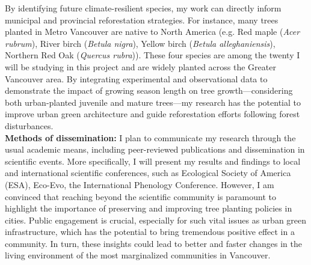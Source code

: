 \documentclass[11pt,letter]{article}
\begin{document}
\par 
By identifying future climate-resilient species, my work can directly inform municipal and provincial reforestation strategies. For instance, many trees planted in Metro Vancouver are native to North America (e.g. Red maple (\textit{Acer rubrum}), River birch (\textit{Betula nigra}), Yellow birch (\textit{Betula alleghaniensis}), Northern Red Oak (\textit{Quercus rubra})). These four species are among the twenty I will be studying in this project and are widely planted across the Greater Vancouver area. By integrating experimental and observational data to demonstrate the impact of growing season length on tree growth—considering both urban-planted juvenile and mature trees—my research has the potential to improve urban green architecture and guide reforestation efforts following forest disturbances.\\
\textbf{Methods of dissemination:} I plan to communicate my research through the usual academic means, including peer-reviewed publications and dissemination in scientific events. More specifically, I will present my results and findings to local and international scientific conferences, such as Ecological Society of America (ESA), Eco-Evo, the International Phenology Conference. However, I am convinced that reaching beyond the scientific community is paramount to highlight the importance of preserving and improving tree planting policies in cities. Public engagement is crucial, especially for such vital issues as urban green infrastructure, which has the potential to bring tremendous positive effect in a community. In turn, these insights could lead to better and faster changes in the living environment of the most marginalized communities in Vancouver.
\end{document}
